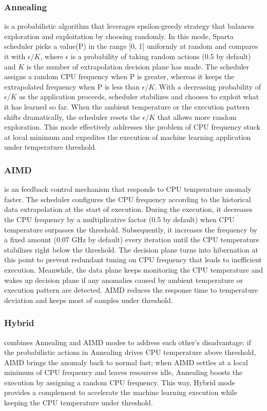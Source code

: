 \subsubsection{Annealing} is a probabilistic algorithm that leverages epsilon-greedy strategy that balances exploration and exploitation by choosing randomly. In this mode, Sparta scheduler picks a value(P) in the range [0, 1] uniformly at random and compares it with $\epsilon/K$, where $\epsilon$ is a probability of taking random actions (0.5 by default) and $K$ is the number of extrapolation decision plane has made. The scheduler assigns a random CPU frequency when P is greater, whereas it keeps the extrapolated frequency when P is less than $\epsilon/K$. With a decreasing probability of $\epsilon/K$ as the application proceeds, scheduler stabilizes and chooses to exploit what it has learned so far. When the ambient temperature or the execution pattern shifts dramatically, the scheduler resets the $\epsilon/K$ that allows more random exploration. This mode effectively addresses the problem of CPU frequency stuck at local minimum and expedites the execution of machine learning application under temperature threshold.

\subsubsection{AIMD} is an feedback control mechanism that responds to CPU temperature anomaly faster. The scheduler configures the CPU frequency according to the historical data extrapolation at the start of execution. During the execution, it decreases the CPU frequency by a multiplicative factor (0.5 by default) when CPU temperature surpasses the threshold. Subsequently, it increases the frequency by a fixed amount (0.07 GHz by default) every iteration until the CPU temperature stabilizes right below the threshold. The decision plane turns into hibernation at this point to prevent redundant tuning on CPU frequency that leads to inefficient execution. Meanwhile, the data plane keeps monitoring the CPU temperature and wakes up decision plane if any anomalies caused by ambient temperature or execution pattern are detected. AIMD reduces the response time to temperature deviation and keeps most of samples under threshold. 

\subsubsection{Hybrid} combines Annealing and AIMD modes to address each other's disadvantage: if the probabilistic actions in Annealing drives CPU temperature above threshold, AIMD brings the anomaly back to normal fast; when AIMD settles at a local minimum of CPU frequency and leaves resources idle, Annealing boosts the execution by assigning a random CPU frequency. This way, Hybrid mode provides a complement to accelerate the machine learning execution while keeping the CPU temperature under threshold. 
